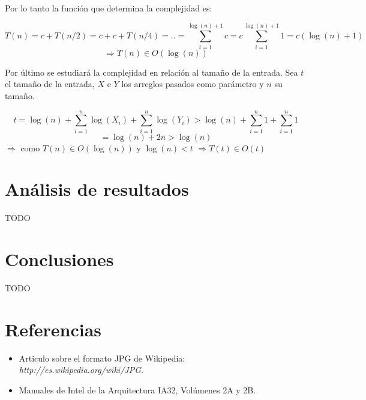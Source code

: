 \documentclass[a4paper,10pt] {article}
\begin{document}
Por lo tanto la funci\'on que determina la complejidad es:

$$T(n)=c+T(n/2)=c+c+T(n/4)=..= \sum_{i=1}^{\log(n)+1}c=c\sum_{i=1}^{\log(n)+1}1=c(\log(n)+1)$$
$$\Longrightarrow T(n)\in O(\log(n))$$

Por \'ultimo se estudiar\'a la complejidad en relaci\'on al tama\~{n}o de la entrada. Sea $t$ el tama\~{n}o de la entrada, $X$ e $Y$ los arreglos pasados como par\'ametro y $n$ su tama\~{n}o.

$$t=\log(n)+\sum_{i=1}^{n}\log(X_{i})+\sum_{i=1}^{n}\log(Y_{i})>\log(n)+\sum_{i=1}^{n} 1+\sum_{i=1}^{n} 1$$
$$=\log(n)+2n>\log(n)$$
\hspace*{90pt}$\Longrightarrow$ como $T(n)\in O(\log(n))$ y $\log(n)<t$ $\Longrightarrow T(t)\in O(t)$

\section*{An\'alisis de resultados}

TODO

\section*{Conclusiones}

TODO

\section*{Referencias}
\begin{itemize}
 \item Articulo sobre el formato JPG de Wikipedia:
\textit{http://es.wikipedia.org/wiki/JPG}.
\end{itemize}
\begin{itemize}
 \item Manuales de Intel de la Arquitectura IA32, Vol\'umenes 2A y 2B.
\end{itemize}
\end{document}
